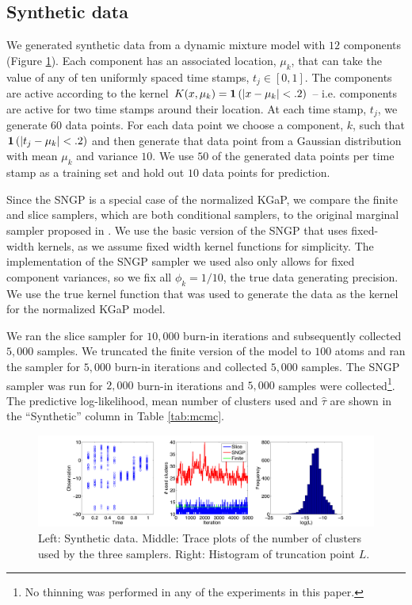 \subsection{Synthetic data}

We generated synthetic data from a dynamic mixture model with $12$
components (Figure \ref{fig:slicestats}).  Each component has an associated 
location, $\mu_k$, that can take
the value of any of ten uniformly spaced time stamps, $t_j \in [0,1]$.  The
components are active according to the kernel $K(x,\mu_k) = \mathbf 1 \left ( |x-\mu_k| <
.2 \right )$ -- i.e. components are active for two time stamps around their location.
At each time stamp, $t_j$, we generate $60$ data points.  For each data point we choose 
a component, $k$, such that $\mathbf 1 \left ( |t_j-\mu_k| < .2 \right )$ and then generate that
data point from a Gaussian distribution with mean $\mu_k$
and variance $10$.  We use $50$ of the generated data points
per time stamp as a training set and hold out $10$ data points for prediction.

Since the SNGP is a special case of the normalized KGaP, we compare the finite 
and slice
samplers, which are both conditional samplers, to the original marginal sampler
proposed in \cite{Rao:Teh:2009}.  We use the basic version of the SNGP that 
uses fixed-width kernels, as we assume fixed width kernel functions for simplicity.
The implementation of the SNGP sampler we used also only allows for fixed
component variances, so we fix all $\phi_k = 1/10$, the true data generating
precision.  We use the true kernel function that was used to generate the data 
as the kernel for the normalized KGaP model.

We ran the slice sampler for $10,000$ burn-in iterations and subsequently
collected $5,000$ samples.  We truncated the finite version of the model to
$100$ atoms and ran the sampler for $5,000$ burn-in iterations and collected
$5,000$ samples.  The SNGP sampler was run for $2,000$ burn-in iterations and
$5,000$ samples were collected\footnote{No thinning was performed in any of the
experiments in this paper.}.  The predictive log-likelihood, mean number of 
clusters used and $\hat{\tau}$ are shown in the ``Synthetic'' column in Table 
\ref{tab:mcmc}.

\begin{figure}[t]
  \begin{center}
    \includegraphics[scale=0.32]{figs/synth_stats.pdf}
  \end{center}
  \caption{Left: Synthetic data.  Middle: Trace plots of the number of clusters
  used by the three samplers.  Right: Histogram of truncation point $L$.
  }
  \label{fig:slicestats}
\end{figure}

